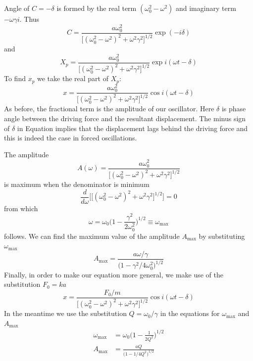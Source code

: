 \documentclass[../../../main.tex]{subfiles}
\begin{document}
Angle of $C=-\delta$ is formed by the real term $(\omega_0^2-\omega^2)$ and imaginary term $-\omega\gamma i$. Thus
\begin{equation*}
    C=\frac{a\omega_0^2 }{\big[(\omega_0^2- \omega^2)^2 +\omega^2\gamma^2\big]^{1/2} }\exp (-i\delta )
\end{equation*}
and 
\begin{equation*}
    X_p=\frac{a\omega_0^2 }{\big[(\omega_0^2- \omega^2)^2 +\omega^2\gamma^2\big]^{1/2} }\exp i(\omega t-\delta )
\end{equation*}
To find $x_p$ we take the real part of $X_p$:
\begin{equation*}
    x=\frac{a\omega_0^2 }{\big[(\omega_0^2- \omega^2)^2 +\omega^2\gamma^2\big]^{1/2} }\cos i(\omega t-\delta )
\end{equation*}
As before, the fractional term is the amplitude of our oscillator. Here $\delta $ is phase angle between the driving force and the resultant displacement. The minus sign of $\delta $ in Equation implies that the displacement lags behind the driving force and this is indeed the case in forced oscillations. 

The amplitude
\begin{equation*}
    A(\omega)=\frac{a\omega_0^2 }{\big[(\omega_0^2- \omega^2)^2 +\omega^2\gamma^2\big]^{1/2} }
\end{equation*}
is maximum when the denominator is minimum
\begin{equation*}
    \frac{d}{d\omega}\biggl[\big[(\omega_0^2- \omega^2)^2 +\omega^2\gamma^2\big]^{1/2} \biggr]= 0
\end{equation*}
from which 
\begin{equation*}
    \omega=\omega_0\bigg(1-\frac{\gamma^2}{2\omega_0^2}\bigg)^{1/2}\equiv\omega_{\text{max}}
\end{equation*}
follows. We can find the maximum value of the amplitude $A_{\text{max}}$ by substituting $\omega_{\text{max}}$
\begin{equation*}
    A_{\text{max}}=\frac{a\omega/\gamma}{\big(1-\gamma^2/4\omega_0^2 \big)^{1/2}}
\end{equation*}
Finally, in order to make our equation more general, we make use of the substitution $F_0 = ka$
\begin{equation*}
    x=\frac{F_0/m }{\big[(\omega_0^2- \omega^2)^2 +\omega^2\gamma^2\big]^{1/2} }\cos i(\omega t-\delta )
\end{equation*}
In the meantime we use the substitution $Q = \omega_0/\gamma$ in the equations for $\omega_{\text{max}}$ and $A_{\text{max}}$
\begin{align*}
    \omega_{\text{max}}&=\omega_0\bigg(1-\frac{1}{2Q^2}\bigg)^{1/2}\\
    A_{\text{max}}&=\frac{aQ}{\big(1-1/4Q^2 \big)^{1/2}}
\end{align*}
\end{document}
